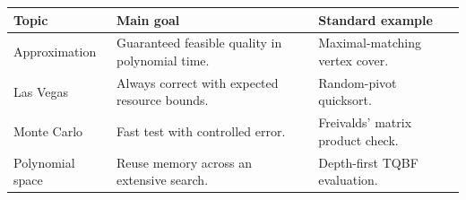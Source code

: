 \documentclass[12pt,a4paper]{article}
\begin{document}
\begin{tcolorbox}[tikzbox, title={Summary Comparison}]
\par\vspace{5pt}
\begingroup
\setlength{\extrarowheight}{1pt}
\noindent\begin{tabularx}{\linewidth}{|B{3.45cm}|Y|Y|}
\hline
\textbf{Topic} & \textbf{Main goal} & \textbf{Standard example} \\ \hline
Approximation & Guaranteed feasible quality in polynomial time. & Maximal-matching vertex cover. \\ \hline
Las Vegas & Always correct with expected resource bounds. & Random-pivot quicksort. \\ \hline
Monte Carlo & Fast test with controlled error. & Freivalds' matrix product check. \\ \hline
Polynomial space & Reuse memory across an extensive search. & Depth-first TQBF evaluation. \\ \hline
\end{tabularx}\par
\endgroup
\end{tcolorbox}
\end{document}
